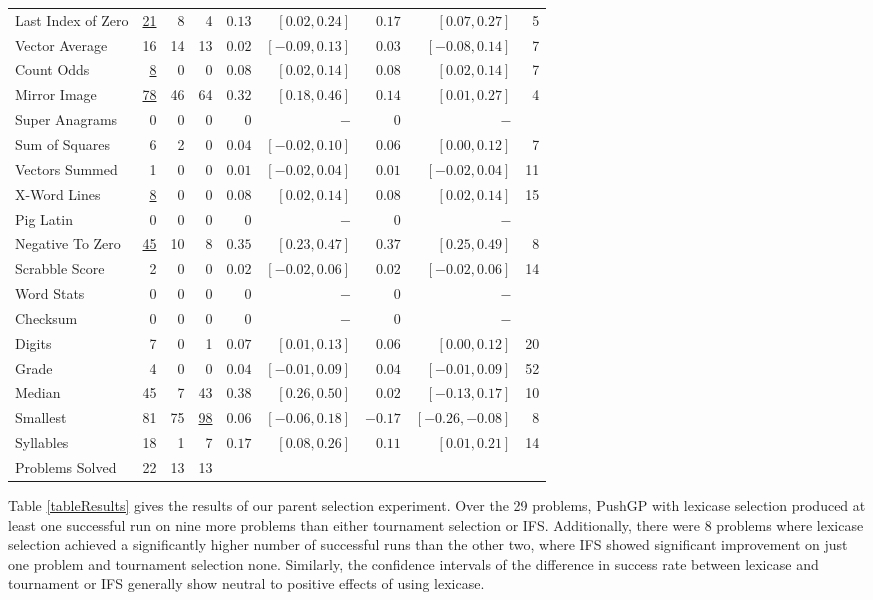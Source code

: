 \documentclass{sig-alternate}
\begin{document}
\begin{table*}[t]
\begin{tabular}{>{\raggedright}m{3.7cm} rrr|rrrr|r}
Last Index of Zero  & \underline{21}         & 8       & 4        & $0.13$ & $[0.02, 0.24]$ & $0.17$ & $[0.07, 0.27]$ & 5 \tabularnewline
Vector Average  & 16            & 14      & 13        & $0.02$ & $[-0.09, 0.13]$ & $0.03$ & $[-0.08, 0.14]$ & 7 \tabularnewline
Count Odds   & \underline{8}               & 0       & 0          & $0.08$ & $[0.02, 0.14]$ & $0.08$ & $[0.02, 0.14]$ & 7 \tabularnewline
Mirror Image   & \underline{78}              & 46      & 64       & $0.32$ & $[0.18, 0.46]$ & $0.14$ & $[0.01, 0.27]$ & 4 \tabularnewline
Super Anagrams             & 0       & 0   & 0        & $0$ & $-$ & $0$ & $-$ &  \tabularnewline
Sum of Squares  & 6             & 2       & 0         & $0.04$ & $[-0.02, 0.10]$ & $0.06$ & $[0.00, 0.12]$ & 7 \tabularnewline
Vectors Summed    & 1           & 0       & 0         & $0.01$ & $[-0.02, 0.04]$ & $0.01$ & $[-0.02, 0.04]$ & 11 \tabularnewline
X-Word Lines    & \underline{8}              & 0       & 0        & $0.08$ & $[0.02, 0.14]$ & $0.08$ & $[0.02, 0.14]$ & 15 \tabularnewline
Pig Latin                  & 0       & 0   & 0        &   $0$ & $-$ & $0$ & $-$ &  \tabularnewline
Negative To Zero  & \underline{45}           & 10      & 8        & $0.35$ & $[0.23, 0.47]$ & $0.37$ & $[0.25, 0.49]$ & 8 \tabularnewline
Scrabble Score    & 2             & 0       & 0       & $0.02$ & $[-0.02, 0.06]$ & $0.02$ & $[-0.02, 0.06]$ & 14 \tabularnewline
Word Stats                 & 0       & 0   & 0        & $0$ & $-$ & $0$ & $-$ &  \tabularnewline
Checksum                   & 0       & 0   & 0        &  $0$ & $-$ & $0$ & $-$ &  \tabularnewline
Digits    & 7                     & 0       & 1       & $0.07$ & $[0.01, 0.13]$ & $0.06$ & $[0.00, 0.12]$ & 20 \tabularnewline
Grade      & 4                    & 0       & 0       & $0.04$ & $[-0.01, 0.09]$ & $0.04$ & $[-0.01, 0.09]$ & 52 \tabularnewline
Median    & 45                   & 7       & 43       & $0.38$ & $[0.26, 0.50]$ & $0.02$ & $[-0.13, 0.17]$ & 10 \tabularnewline
Smallest   & 81                   & 75      & \underline{98}      & $0.06$ & $[-0.06, 0.18]$ & $-0.17$ & $[-0.26, -0.08]$ & 8 \tabularnewline
Syllables   & 18                 & 1       & 7        & $0.17$ & $[0.08, 0.26]$ & $0.11$ & $[0.01, 0.21]$ & 14 \tabularnewline
\midrule
\rowcolor{white} Problems Solved     & 22       & 13       & 13     & & & & &   \\
\bottomrule
\end{tabular}
\end{table*}


Table \ref{tableResults} gives the results of our parent selection experiment. Over the 29 problems, PushGP with lexicase selection produced at least one successful run on nine more problems than either tournament selection or IFS. Additionally, there were 8 problems where lexicase selection achieved a significantly higher number of successful runs than the other two, where IFS showed significant improvement on just one problem and tournament selection none. Similarly, the confidence intervals of the difference in success rate between lexicase and tournament or IFS generally show neutral to positive effects of using lexicase.
\end{document}
